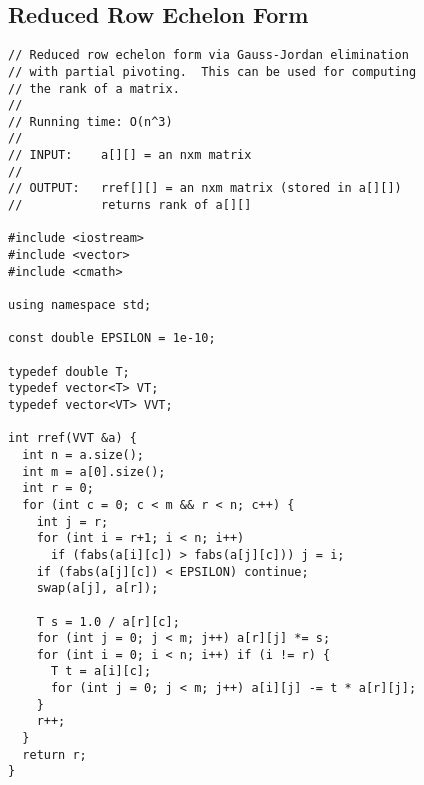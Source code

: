 \documentclass[letterpaper]{article}
\begin{document}
\clearpage
\subsection{Reduced Row Echelon Form}

\begin{lstlisting}
// Reduced row echelon form via Gauss-Jordan elimination 
// with partial pivoting.  This can be used for computing
// the rank of a matrix.
//
// Running time: O(n^3)
//
// INPUT:    a[][] = an nxm matrix
//
// OUTPUT:   rref[][] = an nxm matrix (stored in a[][])
//           returns rank of a[][]

#include <iostream>
#include <vector>
#include <cmath>

using namespace std;

const double EPSILON = 1e-10;

typedef double T;
typedef vector<T> VT;
typedef vector<VT> VVT;

int rref(VVT &a) {
  int n = a.size();
  int m = a[0].size();
  int r = 0;
  for (int c = 0; c < m && r < n; c++) {
    int j = r;
    for (int i = r+1; i < n; i++) 
      if (fabs(a[i][c]) > fabs(a[j][c])) j = i;
    if (fabs(a[j][c]) < EPSILON) continue;
    swap(a[j], a[r]);
   
    T s = 1.0 / a[r][c];
    for (int j = 0; j < m; j++) a[r][j] *= s;
    for (int i = 0; i < n; i++) if (i != r) {
      T t = a[i][c];
      for (int j = 0; j < m; j++) a[i][j] -= t * a[r][j];
    }
    r++;
  }
  return r;
}
\end{lstlisting}
\end{document}
